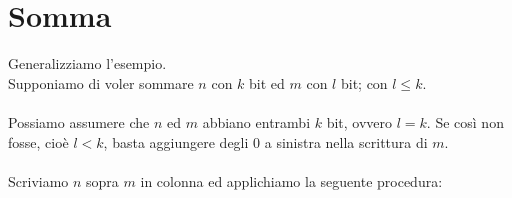 \documentclass[a4paper,12pt, oneside]{book}
\begin{document}
	\section{Somma}
		Generalizziamo l'esempio.\\
		Supponiamo di voler sommare $n$ con $k$ bit ed $m$ con $l$ bit; con $l \leq k$.\\\\
		Possiamo assumere che $n$ ed $m$ abbiano entrambi $k$ bit, ovvero $l=k$. Se così non fosse, cioè $l<k$, basta aggiungere degli $0$ a sinistra nella scrittura di $m$.\\\\
		Scriviamo $n$ sopra $m$ in colonna ed applichiamo la seguente procedura:
\end{document}
